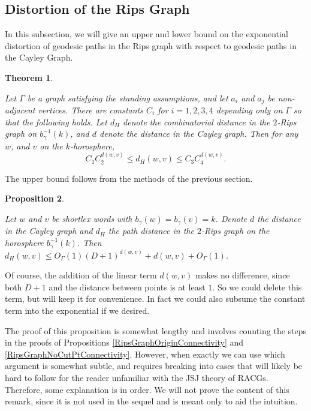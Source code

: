 \documentclass[10pt,a4paper]{amsart}
\newtheorem{theorem}{Theorem}[subsection]
\newtheorem{proposition}[theorem]{Proposition}
\theoremstyle{definition}
\theoremstyle{remark}
\begin{document}
	\subsection{Distortion of the Rips Graph}
	\label{subsec:RipsDistortion}

	In this subsection, we will give an upper and lower bound on the exponential distortion of geodesic paths in the Rips graph with respect to geodesic paths in the Cayley Graph.

	\begin{theorem}\label{RipsGraphDistortion}
		
		Let $\Gamma$ be a graph satisfying the standing assumptions, and let $a_i$ and $a_j$ be non-adjacent vertices. There are constants $C_i$ for $i=1, 2, 3, 4$ depending only on $\Gamma$ so that the following holds. Let $d_H$ denote the combinatorial distance in the $2$-Rips graph on $b_\gamma^{-1}(k)$, and $d$ denote the distance in the Cayley graph. Then for any $w$, and $v$ on the $k$-horosphere, $$C_1 C_2^{d(w,v)}\le d_H(w,v)\le C_3 C_4^{d(w,v)}.$$
		
	\end{theorem}	
	
	The upper bound follows from the methods of the previous section.
	
	\begin{proposition} \label{HorosphericalDistortionUpperBound}
		
		Let $w$ and $v$ be shortlex words with $b_\gamma(w)=b_\gamma(v) = k$. Denote $d$ the distance in the Cayley graph and $d_H$ the path distance in the $2$-Rips graph on the horosphere $b_\gamma^{-1}(k)$. Then $d_H(w,v)\le O_\Gamma(1)(D+1)^{d(w,v)}+d(w,v)+O_\Gamma(1)$.
		
		
	\end{proposition}
	
	Of course, the addition of the linear term $d(w,v)$ makes no difference, since both $D+1$ and the distance between points is at least $1$. So we could delete this term, but will keep it for convenience. In fact we could also subsume the constant term into the exponential if we desired.
	
	The proof of this proposition is somewhat lengthy and involves counting the steps in the proofs of Propositions \ref{RipsGraphOriginConnectivity} and \ref{RipsGraphNoCutPtConnectivity}. However, when exactly we can use which argument is somewhat subtle, and requires breaking into cases that will likely be hard to follow for the reader unfamiliar with the JSJ theory of RACGs. Therefore, some explanation is in order. We will not prove the content of this remark, since it is not used in the sequel and is meant only to aid the intuition.
\end{document}
